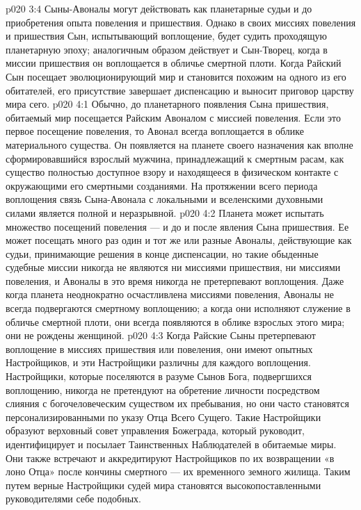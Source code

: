 \vs p020 3:4 Сыны\hyp{}Авоналы могут действовать как планетарные судьи и до приобретения опыта повеления и пришествия. Однако в своих миссиях повеления и пришествия Сын, испытывающий воплощение, будет судить проходящую планетарную эпоху; аналогичным образом действует и Сын\hyp{}Творец, когда в миссии пришествия он воплощается в обличье смертной плоти. Когда Райский Сын посещает эволюционирующий мир и становится похожим на одного из его обитателей, его присутствие завершает диспенсацию и выносит приговор царству мира сего.
\vs p020 4:1 Обычно, до планетарного появления Сына пришествия, обитаемый мир посещается Райским Авоналом с миссией повеления. Если это первое посещение повеления, то Авонал всегда воплощается в облике материального существа. Он появляется на планете своего назначения как вполне сформировавшийся взрослый мужчина, принадлежащий к смертным расам, как существо полностью доступное взору и находящееся в физическом контакте с окружающими его смертными созданиями. На протяжении всего периода воплощения связь Сына\hyp{}Авонала с локальными и вселенскими духовными силами является полной и неразрывной.
\vs p020 4:2 Планета может испытать множество посещений повеления --- и до и после явления Сына пришествия. Ее может посещать много раз один и тот же или разные Авоналы, действующие как судьи, принимающие решения в конце диспенсации, но такие обыденные судебные миссии никогда не являются ни миссиями пришествия, ни миссиями повеления, и Авоналы в это время никогда не претерпевают воплощения. Даже когда планета неоднократно осчастливлена миссиями повеления, Авоналы не всегда подвергаются смертному воплощению; а когда они исполняют служение в обличье смертной плоти, они всегда появляются в облике взрослых этого мира; они не рождены женщиной.
\vs p020 4:3 Когда Райские Сыны претерпевают воплощение в миссиях пришествия или повеления, они имеют опытных Настройщиков, и эти Настройщики различны для каждого воплощения. Настройщики, которые поселяются в разуме Сынов Бога, подвергшихся воплощению, никогда не претендуют на обретение личности посредством слияния с богочеловеческим существом их пребывания, но они часто становятся персонализированными по указу Отца Всего Сущего. Такие Настройщики образуют верховный совет управления Божеграда, который руководит, идентифицирует и посылает Таинственных Наблюдателей в обитаемые миры. Они также встречают и аккредитируют Настройщиков по их возвращении «в лоно Отца» после кончины смертного --- их временного земного жилища. Таким путем верные Настройщики судей мира становятся высокопоставленными руководителями себе подобных.
